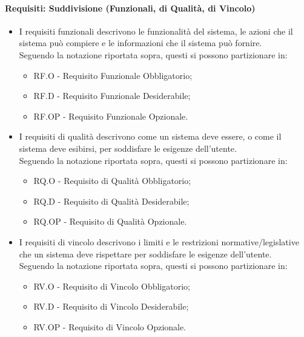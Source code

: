 \documentclass[10pt, a4paper]{article}
\begin{document}
\paragraph{Requisiti: Suddivisione (Funzionali, di Qualità, di Vincolo)}
\begin{itemize}
\item I requisiti funzionali descrivono le funzionalità del sistema, le azioni
che il sistema può compiere e le informazioni che il sistema può fornire.\\
Seguendo la notazione riportata sopra, questi si possono partizionare in:
\begin{itemize}
    \item RF.O - Requisito Funzionale Obbligatorio;
    \item RF.D - Requisito Funzionale Desiderabile;
    \item RF.OP - Requisito Funzionale Opzionale.
\end{itemize}
\end{itemize}
\begin{itemize}
\item I requisiti di qualità descrivono come un sistema deve essere, o
come il sistema deve esibirsi, per soddisfare le esigenze dell'utente.\\
Seguendo la notazione riportata sopra, questi si possono partizionare in:
\begin{itemize}
    \item RQ.O - Requisito di Qualità Obbligatorio;
    \item RQ.D - Requisito di Qualità Desiderabile;
    \item RQ.OP - Requisito di Qualità Opzionale.
\end{itemize}
\end{itemize}
\begin{itemize}
\item I requisiti di vincolo descrivono i limiti e le restrizioni normative/legislative che un sistema
deve rispettare per soddisfare le esigenze dell'utente.\\
Seguendo la notazione riportata sopra, questi si possono partizionare in:
\begin{itemize}
    \item RV.O - Requisito di Vincolo Obbligatorio;
    \item RV.D - Requisito di Vincolo Desiderabile;
    \item RV.OP - Requisito di Vincolo Opzionale. 
\end{itemize}
\end{itemize}
\end{document}

